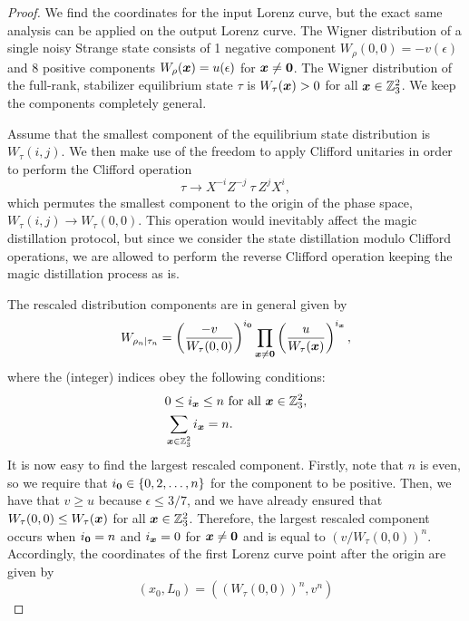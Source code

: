 \documentclass[pra,
aps,
twocolumn,
superscriptaddress,
groupedaddress,
nofootinbib,
reprint
]{revtex4-1}
\begin{document}
\begin{proof}
We find the coordinates for the input Lorenz curve, but the exact same analysis can be applied on the output Lorenz curve.
The Wigner distribution of a single noisy Strange state consists of 1 negative component $W_{\rho}(0,0) = -v(\epsilon)$ and 8 positive components $W_{\rho}(\bm{x}) = u(\epsilon)$ for $\bm{x} \neq \bm{0}$.
The Wigner distribution of the full-rank, stabilizer equilibrium state $\tau$ is $W_{\tau}(\bm{x}) > 0$ for all $\bm{x} \in \mathbb{Z}_3^2$.
We keep the components completely general.

Assume that the smallest component of the equilibrium state distribution is $W_{\tau}(i,j)$.
We then make use of the freedom to apply Clifford unitaries in order to perform the  Clifford operation
\begin{equation}
	\tau \longrightarrow X^{-i}Z^{-j}\ \tau\ Z^{j}X^{i},
\end{equation}
which permutes the smallest component to the origin of the phase space, $W_{\tau}(i,j) \longrightarrow W_{\tau}(0,0)$.
This operation would inevitably affect the magic distillation protocol, but since we consider the state distillation modulo Clifford operations, we are allowed to perform the reverse Clifford operation keeping the magic distillation process as is. 

The rescaled distribution components are in general given by
\begin{equation}
	W_{\rho_n|\tau_n} = \left(\frac{-v}{W_{\tau}(0,0)}\right)^{i_{\bm{0}}} \prod_{\bm{x} \neq \bm{0}} \left(\frac{u}{W_{\tau}(\bm{x})}\right)^{i_{\bm{x}}},
\end{equation}
where the (integer) indices obey the following conditions:
\begin{align}
&0 \leq i_{\bm{x}} \leq n \mbox{ for all } \bm{x} \in \mathbb{Z}_3^2, \nonumber \\
&\sum_{\bm{x} \in \mathbb{Z}_3^2} i_{\bm{x}} = n.
\end{align}
It is now easy to find the largest rescaled component.
Firstly, note that $n$ is even, so we require that $i_{\bm{0}} \in \{0,2,\dots,n\}$ for the component to be positive.
Then, we have that $v \geq u$ because $\epsilon \leq 3/7$, and we have already ensured that $W_{\tau}(0,0) \leq W_{\tau}(\bm{x})$ for all $\bm{x} \in \mathbb{Z}_3^2$.
Therefore, the largest rescaled component occurs when $i_{\bm{0}} = n$ and $i_{\bm{x}} = 0$ for $\bm{x} \neq \bm{0}$ and is equal to $(v/W_{\tau}(0,0))^n$.
Accordingly, the coordinates of the first Lorenz curve point after the origin are given by
\begin{equation}
	(x_0, L_0) = ((W_{\tau}(0,0))^n, v^n)
\end{equation}


\end{proof}
\end{document}
